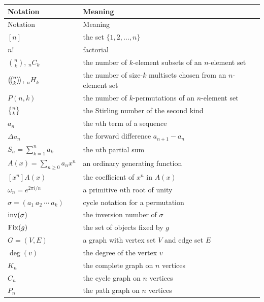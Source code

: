     {\small
    \renewcommand{\arraystretch}{1.18}
    \begin{longtable}{@{}L{0.27\textwidth}L{0.65\textwidth}@{}}
        \toprule
        Notation & Meaning \\
        \midrule
        \endfirsthead

        \toprule
        Notation & Meaning \\
        \midrule
        \endhead

        \bottomrule
        \endlastfoot

        $[n]$ & the set $\{1,2,\dots,n\}$ \\
        $n!$ & factorial \\
        $\binom{n}{k}$, ${}_nC_k$ & the number of $k$-element subsets of an $n$-element set \\
        $\left(\!\binom{n}{k}\!\right)$, ${}_nH_k$ & the number of size-$k$ multisets chosen from an $n$-element set \\
        $P(n,k)$ & the number of $k$-permutations of an $n$-element set \\
        $\stirlingsecond{n}{k}$ & the Stirling number of the second kind \\
        $a_n$ & the $n$th term of a sequence \\
        $\Delta a_n$ & the forward difference $a_{n+1}-a_n$ \\
        $S_n=\displaystyle\sum_{k=1}^{n}a_k$ & the $n$th partial sum \\
        $A(x)=\displaystyle\sum_{n\geq0}a_nx^n$ & an ordinary generating function \\
        $[x^n]A(x)$ & the coefficient of $x^n$ in $A(x)$ \\
        $\omega_n=e^{2\pi i/n}$ & a primitive $n$th root of unity \\
        $\sigma=(a_1\ a_2\ \cdots\ a_k)$ & cycle notation for a permutation \\
        $\operatorname{inv}(\sigma)$ & the inversion number of $\sigma$ \\
        $\operatorname{Fix}(g)$ & the set of objects fixed by $g$ \\
        $G=(V,E)$ & a graph with vertex set $V$ and edge set $E$ \\
        $\deg(v)$ & the degree of the vertex $v$ \\
        $K_n$ & the complete graph on $n$ vertices \\
        $C_n$ & the cycle graph on $n$ vertices \\
        $P_n$ & the path graph on $n$ vertices \\
    \end{longtable}
    }

